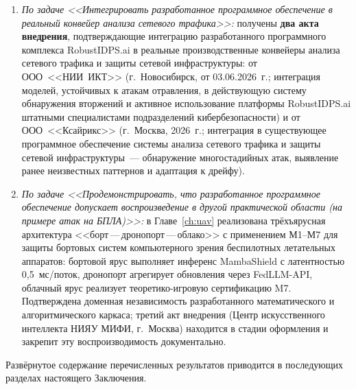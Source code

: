 \begin{enumerate}[leftmargin=2em, itemsep=0pt]
\item \textit{По задаче <<Интегрировать разработанное программное
обеспечение в реальный конвейер анализа сетевого трафика>>:}
получены \textbf{два акта внедрения}, подтверждающие интеграцию
разработанного программного комплекса RobustIDPS.ai в реальные
производственные конвейеры анализа сетевого трафика и защиты
сетевой инфраструктуры: от ООО~<<НИИ~ИКТ>> (г.~Новосибирск,
от 03.06.2026~г.; интеграция моделей, устойчивых к атакам
отравления, в действующую систему обнаружения вторжений и
активное использование платформы RobustIDPS.ai штатными
специалистами подразделений кибербезопасности) и от
ООО~<<Ксайрикс>> (г.~Москва, 2026~г.; интеграция в существующее
программное обеспечение системы анализа сетевого трафика и
защиты сетевой инфраструктуры~--- обнаружение многостадийных
атак, выявление ранее неизвестных паттернов и адаптация к
дрейфу).

\item \textit{По задаче <<Продемонстрировать, что разработанное
программное обеспечение допускает воспроизведение в другой
практической области (на примере атак на БПЛА)>>:} в
Главе~\ref{ch:uav} реализована трёхъярусная архитектура
<<борт\,---\,дронопорт\,---\,облако>> с применением М1--М7 для
защиты бортовых систем компьютерного зрения беспилотных
летательных аппаратов: бортовой ярус выполняет инференс
MambaShield с латентностью 0{,}5~мс/поток, дронопорт агрегирует
обновления через FedLLM-API, облачный ярус реализует
теоретико-игровую сертификацию M7. Подтверждена доменная
независимость разработанного математического и алгоритмического
каркаса; третий акт внедрения (Центр искусственного интеллекта
НИЯУ МИФИ, г.~Москва) находится в стадии оформления и закрепит
эту воспроизводимость документально.

\end{enumerate}

\noindent Развёрнутое содержание перечисленных результатов
приводится в последующих разделах настоящего Заключения.

\bigskip

